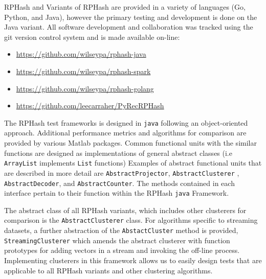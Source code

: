 


\textsf{RPHash} and Variants of \textsf{RPHash} are provided in a variety of languages (Go, Python, and Java), however the primary
testing and development is done on the Java variant.  All software development and collaboration was
tracked using the git version control system and is made available on-line: 
\begin{itemize}
\item \url{https://github.com/wilseypa/rphash-java}
\item \url{https://github.com/wilseypa/rphash-spark}
\item \url{https://github.com/wilseypa/rphash-golang}
\item \url{https://github.com/leecarraher/PyRecRPHash}
\end{itemize}

The \textsf{RPHash} test frameworks is designed in \texttt{java} following an object-oriented approach.  Additional
performance metrics and algorithms for comparison are provided by various Matlab packages.
Common functional units with the similar functions are designed as implementations of general abstract classes (i.e 
\texttt{ArrayList} implements \texttt{List} functions)
Examples of abstract functional units that are described in more detail are \texttt{AbstractProjector},
\texttt{AbstractClusterer} , \texttt{AbstractDecoder}, and \texttt{AbstractCounter}.  The methods contained in each interface
pertain to their function within the \textsf{RPHash} \texttt{java} Framework.

The abstract class of all \textsf{RPHash} variants, which includes other clusterers for comparison is the \texttt{AbstractClusterer} class.
For algorithms specific to streaming datasets, a further abstraction of the \texttt{AbstactCluster} method is provided, \texttt{StreamingClusterer}
which amends the abstract clusterer with function prototypes for adding vectors in a stream and invoking the off-line process.  Implementing
clusterers in this framework allows us to easily design tests that are applicable to all \textsf{RPHash} variants and other clustering algorithms.

